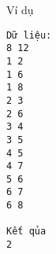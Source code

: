 Ví dụ  
\begin{verbatim}
Dữ liệu:
8 12
1 2
1 6
1 8
2 3
2 6
3 4
3 5
4 5
4 7
5 6
6 7
6 8

Kết qủa
2
\end{verbatim}